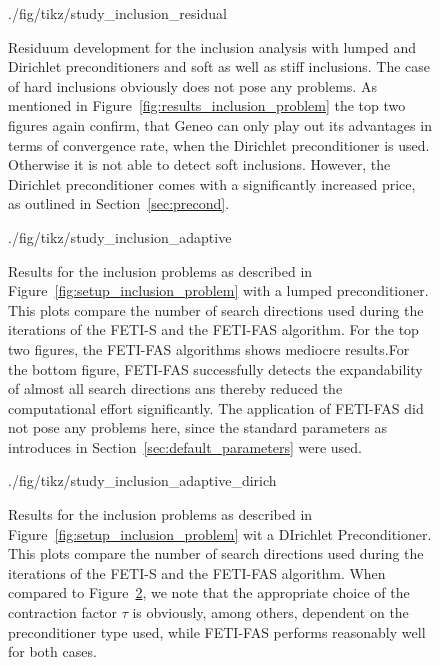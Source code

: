 \begin{figure}[tb]
  \begin{center}
    {./fig/tikz/study_inclusion_residual}
    \caption[Study of inclusion handling: residua]{Residuum development for the inclusion analysis with lumped and Dirichlet preconditioners and soft as well as stiff inclusions. The case of hard inclusions obviously does not pose any problems. As mentioned in Figure~\ref{fig:results_inclusion_problem} the top two figures again confirm, that Geneo can only play out its advantages in terms of convergence rate, when the Dirichlet preconditioner is used. Otherwise it is not able to detect soft inclusions. However, the Dirichlet preconditioner comes with a significantly increased price, as outlined in Section~\ref{sec:precond}. }
    \label{fig:results_inclusion_problem_residuum}
  \end{center}
\end{figure}


\begin{figure}[tb]
  \begin{center}
    {./fig/tikz/study_inclusion_adaptive}
    \caption[Study of inclusion handling: \# search directions with lumped preconditioner]{Results for the inclusion problems as described in Figure~\ref{fig:setup_inclusion_problem} with a lumped preconditioner. This plots compare the number of search directions used during the iterations of the FETI-S and the FETI-FAS algorithm. For the top two figures, the FETI-FAS algorithms shows mediocre results.For the bottom figure, FETI-FAS successfully detects the expandability of almost all search directions ans thereby reduced the computational effort significantly. The application of FETI-FAS did not pose any problems here, since the standard parameters as introduces in Section~\ref{sec:default_parameters} were used. }
    \label{fig:results_inclusion_problem_adaptive}
  \end{center}
\end{figure}

\begin{figure}[tb]
  \begin{center}
    {./fig/tikz/study_inclusion_adaptive_dirich}
    \caption[Study of inclusion handling: \# search directions with Dirichlet preconditioner]{Results for the inclusion problems as described in Figure~\ref{fig:setup_inclusion_problem} wit a DIrichlet Preconditioner. This plots compare the number of search directions used during the iterations of the FETI-S and the FETI-FAS algorithm. When compared to Figure~\ref{fig:results_inclusion_problem_adaptive}, we note that the appropriate choice of the contraction factor $\tau$ is obviously, among others, dependent on the preconditioner type used, while FETI-FAS  performs reasonably well for both cases.}
    \label{fig:results_inclusion_problem_adaptive_dirich}
  \end{center}
\end{figure}


